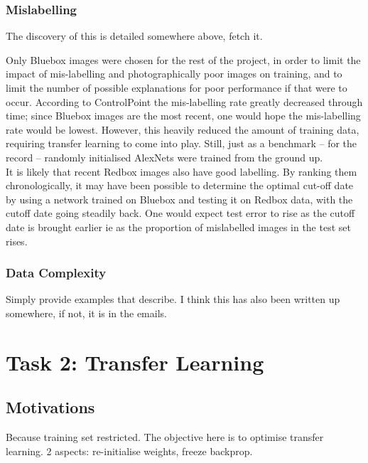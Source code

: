 \documentclass[a4paper,11pt]{article}
\begin{document}
\subsubsection{Mislabelling}

The discovery of this is detailed somewhere above, fetch it.


Only Bluebox images were chosen for the rest of the project, in order to limit the impact of mis-labelling and photographically poor images on training, and to limit the number of possible explanations for poor performance if that were to occur. According to ControlPoint the mis-labelling rate greatly decreased through time; since Bluebox images are the most recent, one would hope the mis-labelling rate would be lowest. However, this heavily reduced the amount of training data, requiring transfer learning to come into play. Still, just as a benchmark -- for the record -- randomly initialised AlexNets were trained from the ground up. \\

It is likely that recent Redbox images also have good labelling. By ranking them chronologically, it may have been possible to determine the optimal cut-off date by using a network trained on Bluebox and testing it on Redbox data, with the cutoff date going steadily back. One would expect test error to rise as the cutoff date is brought earlier ie as the proportion of mislabelled images in the test set rises. \\


\subsubsection{Data Complexity}

Simply provide examples that describe. I think this has also been written up somewhere, if not, it is in the emails. \\

\clearpage
\section{Task 2: Transfer Learning}

\subsection{Motivations}

Because training set restricted. The objective here is to optimise transfer learning.
2 aspects: re-initialise weights, freeze backprop.
\end{document}

